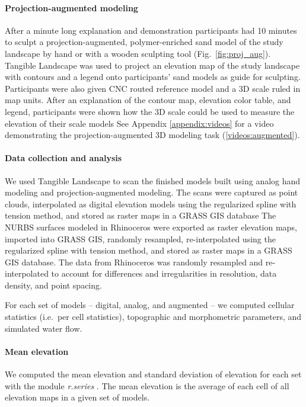 \documentclass[prodmode,acmtochi]{acmsmall} %
\begin{document}
\paragraph{Projection-augmented modeling}
After a minute long explanation and demonstration
participants had 10 minutes to sculpt
a projection-augmented, polymer-enriched sand model
of the study landscape by hand or with a wooden sculpting tool 
(Fig.~\ref{fig:proj_aug}). 
Tangible Landscape was used to project 
an elevation map of the study landscape
with contours and a legend
onto participants' sand models as guide for sculpting. 
Participants were also given CNC routed reference model and 
a 3D scale ruled in map units. 
After an explanation of the contour map, elevation color table, and legend,
participants were shown how the 3D scale could be used to 
measure the elevation of their scale models
%
See Appendix \ref{appendix:videos}
for a video demonstrating the projection-augmented 3D modeling task (\ref{videos:augmented}).

\paragraph{Data collection and analysis}
We used Tangible Landscape to scan the finished models 
built using analog hand modeling and projection-augmented modeling.
The scans were captured as point clouds, interpolated 
as digital elevation models using the regularized spline with tension method,
and stored as raster maps in a GRASS GIS database 
The NURBS surfaces modeled in Rhinoceros were exported as raster elevation maps,
imported into GRASS GIS, randomly resampled, 
re-interpolated using the regularized spline with tension method, 
and stored as raster maps in a GRASS GIS database. 
The data from Rhinoceros was randomly resampled and re-interpolated
to account for differences and irregularities in resolution, data density, and point spacing.

For each set of models -- digital, analog, and augmented --
we computed cellular statistics (i.e.~per cell statistics), 
topographic and morphometric parameters, 
and simulated water flow.

\paragraph{Mean elevation}
We computed 
the mean elevation 
and standard deviation of elevation
for each set
with the module \textit{r.series} \cite{r.series}.
The mean elevation is the average of each cell 
of all elevation maps in a given set of models.
\end{document}
